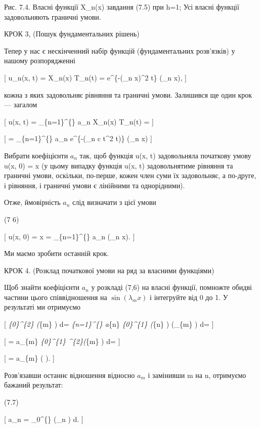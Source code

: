 \documentclass[
  ukrainian,
]{article}
\begin{document}
Рис. 7.4. Власні функції X\_n(x) завдання (7.5) при h=1; Усі власні
функції задовольняють граничні умови.

КРОК 3, (Пошук фундаментальних рішень)

Тепер у нас є нескінченний набір функцій (фундаментальних розв'язків) у
нашому розпорядженні

{[} u\_n(x, t) = X\_n(x) T\_n(t) = e\^{}\{-(\lambda\_n x)\^{}2 t\}
\sin(\lambda\_n x), {]}

кожна з яких задовольняє рівняння та граничні умови. Залишився ще один
крок --- загалом

{[} u(x, t) = \sum\_\{n=1\}\^{}\{\infty\} a\_n X\_n(x) T\_n(t) = {]}

{[} = \sum\_\{n=1\}\^{}\{\infty\} a\_n e\^{}\{-(\lambda\_n c t\^{}2 t)\}
\sin(\lambda\_n x) {]}

Вибрати коефіцієнти \(a_n\) так, щоб функція u(x, t) задовольняла
початкову умову u(x, 0) = x (у цьому випадку функція u(x, t)
задовольнятиме рівняння та граничні умови, оскільки, по-перше, кожен
член суми їх задовольняє, а по-друге, і рівняння, і граничні умови є
лінійними та однорідними).

Отже, ймовірність \(a_n\) слід визначати з цієї умови

(7 6)

{[} u(x, 0) = x = \sum\_\{n=1\}\^{}\{\infty\} a\_n \sin(\lambda\_n x).
{]}

Ми маємо зробити останній крок.

КРОК 4. (Розклад початкової умови на ряд за власними функціями)

Щоб знайти коефіцієнти \(a_n\) у розкладі (7,6) на власні функції,
помножте обидві частини цього співвідношення на \(\sin(\lambda_m x)\) і
інтегруйте від 0 до 1. У результаті ми отримуємо

{[} \int\emph{\{0\}\^{}\{2\} \xi \sin(\lambda}\{m\} \xi) d\xi =
\sum\emph{\{n=1\}\^{}\{\infty\} a}\{n\} \int\emph{\{0\}\^{}\{1\}
\sin(\lambda}\{n\} \xi) \sin(\lambda\_\{m\} \xi) d\xi = {]}

{[} = a\_\{m\} \int\emph{\{0\}\^{}\{1\} \sin\^{}\{2\}(\lambda}\{m\} \xi)
d\xi = {]}

{[} = a\_\{m\} \left(
\right). {]}

Розв'язавши останнє відношення відносно \(a_m\) і замінивши m на n,
отримуємо бажаний результат:

(7.7)

{[} a\_n =
\int\_0\^{}\{\infty\} \xi \sin (\lambda\_n \xi) d\xi. {]}
\end{document}
